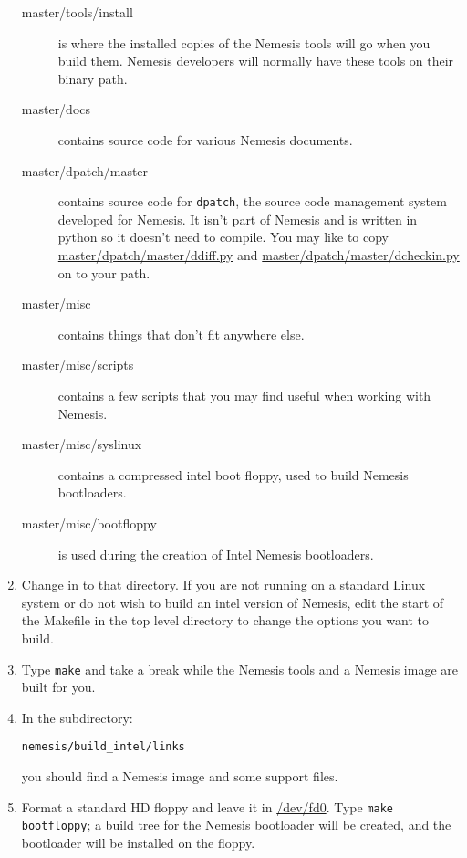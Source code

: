 \documentclass[a4paper]{article}
\newcommand{\cmd}[1]{\texttt{#1}}
\newcommand{\file}[1]{\url{#1}}
\begin{document}
\begin{enumerate}
\begin{description}
\item[master/tools/install] is where the installed copies of the
Nemesis tools will go when you build them. Nemesis developers will
normally have these tools on their binary path.

\item[master/docs] contains source code for various Nemesis documents.

\item[master/dpatch/master] contains source code for \cmd{dpatch},
the source code management system developed for Nemesis. It isn't part
of Nemesis and is written in python so it doesn't need to compile. You
may like to copy \file{master/dpatch/master/ddiff.py} and
\file{master/dpatch/master/dcheckin.py} on to your path.

\item[master/misc] contains things that don't fit anywhere else. 

\item[master/misc/scripts] contains a few scripts that you may 
find  useful when working with Nemesis.

\item[master/misc/syslinux] contains a compressed intel boot floppy,
used to build Nemesis bootloaders.

\item[master/misc/bootfloppy] is used during the creation of Intel
Nemesis bootloaders.
\end{description}

\item Change in to that directory. If you are not running on a
standard Linux system or do not wish to build an intel version of
Nemesis, edit the start of the Makefile in the top level directory to
change the options you want to build.

\item Type \cmd{make} and take a break while the Nemesis tools and
a Nemesis image are built for you.

\item In the subdirectory:

\begin{verbatim}
nemesis/build_intel/links
\end{verbatim}

you should find a Nemesis image and some support files.

\item Format a standard HD floppy and leave it in
\file{/dev/fd0}. Type \cmd{make bootfloppy}; a build tree for the
Nemesis bootloader will be created, and the bootloader will be
installed on the floppy.


\end{enumerate}
\end{document}
